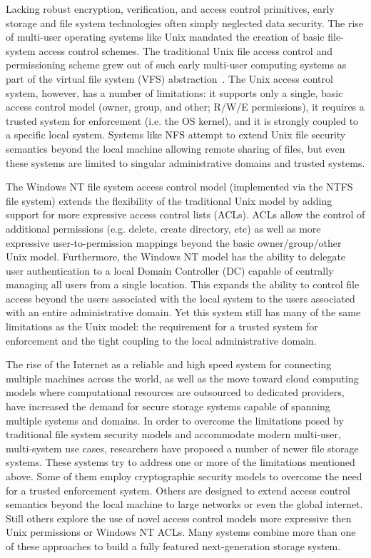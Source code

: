 Lacking robust encryption, verification, and access control
primitives, early storage and file system technologies often simply
neglected data security. The rise of multi-user operating systems like
Unix mandated the creation of basic file-system access control
schemes. The traditional Unix file access control and permissioning
scheme grew out of such early multi-user computing systems as part of
the virtual file system (VFS) abstraction~\cite{linux-vfs}. The Unix
access control system, however, has a number of limitations: it
supports only a single, basic access control model (owner, group, and
other; R/W/E permissions), it requires a trusted system for
enforcement (i.e. the OS kernel), and it is strongly coupled to a
specific local system. Systems like NFS attempt to extend Unix file
security semantics beyond the local machine allowing remote sharing of
files, but even these systems are limited to singular administrative
domains and trusted systems.

The Windows NT file system access control model (implemented via the
NTFS file system) extends the flexibility of the traditional Unix
model by adding support for more expressive access control lists
(ACLs). ACLs allow the control of additional permissions (e.g. delete,
create directory, etc) as well as more expressive user-to-permission
mappings beyond the basic owner/group/other Unix model. Furthermore,
the Windows NT model has the ability to delegate user authentication
to a local Domain Controller (DC) capable of centrally managing all
users from a single location. This expands the ability to control file
access beyond the users associated with the local system to the users
associated with an entire administrative domain. Yet this system still
has many of the same limitations as the Unix model: the requirement
for a trusted system for enforcement and the tight coupling to the
local administrative domain.

The rise of the Internet as a reliable and high speed system for
connecting multiple machines across the world, as well as the move
toward cloud computing models where computational resources are
outsourced to dedicated providers, have increased the demand for
secure storage systems capable of spanning multiple systems and
domains. In order to overcome the limitations posed by traditional
file system security models and accommodate modern multi-user,
multi-system use cases, researchers have proposed a number of newer
file storage systems. These systems try to address one or more of the
limitations mentioned above. Some of them employ cryptographic
security models to overcome the need for a trusted enforcement
system. Others are designed to extend access control semantics beyond
the local machine to large networks or even the global internet. Still
others explore the use of novel access control models more expressive
then Unix permissions or Windows NT ACLs. Many systems combine more
than one of these approaches to build a fully featured next-generation
storage system.

